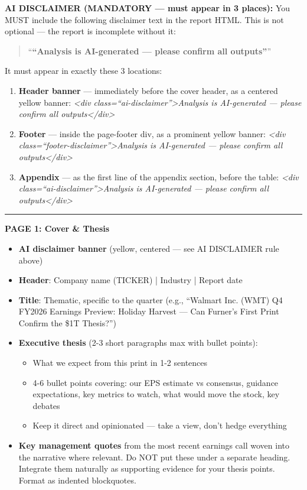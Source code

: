 \documentclass[11pt]{article}
\begin{document}
\textbf{AI DISCLAIMER (MANDATORY — must appear in 3 places):} You MUST include the following disclaimer text in the report HTML. This is not optional — the report is incomplete without it:


\begin{quote}
``\textbf{``Analysis is AI-generated — please confirm all outputs''}''
\end{quote}

It must appear in exactly these 3 locations:

\begin{enumerate}[leftmargin=*,itemsep=2pt,topsep=2pt]
\item {} \textbf{Header banner} — immediately before the cover header, as a centered yellow banner: \emph{<div class=``ai-disclaimer''>Analysis is AI-generated — please confirm all outputs</div>}
\item {} \textbf{Footer} — inside the page-footer div, as a prominent yellow banner: \emph{<div class=``footer-disclaimer''>Analysis is AI-generated — please confirm all outputs</div>}
\item {} \textbf{Appendix} — as the first line of the appendix section, before the table: \emph{<div class=``ai-disclaimer''>Analysis is AI-generated — please confirm all outputs</div>}
\end{enumerate}

\vspace{0.5em}\hrule\vspace{0.5em}

\textbf{PAGE 1: Cover \& Thesis}


\begin{itemize}[leftmargin=*,itemsep=2pt,topsep=2pt]
\item {} \textbf{AI disclaimer banner} (yellow, centered — see AI DISCLAIMER rule above)
\item {} \textbf{Header}: Company name (TICKER) | Industry | Report date
\item {} \textbf{Title}: Thematic, specific to the quarter (e.g., ``Walmart Inc. (WMT) Q4 FY2026 Earnings Preview: Holiday Harvest — Can Furner's First Print Confirm the \$1T Thesis?'')
\item {} \textbf{Executive thesis} (2-3 short paragraphs max with bullet points):
\begin{itemize}[leftmargin=*,itemsep=2pt,topsep=2pt]
\item {} What we expect from this print in 1-2 sentences
\item {} 4-6 bullet points covering: our EPS estimate vs consensus, guidance expectations, key metrics to watch, what would move the stock, key debates
\item {} Keep it direct and opinionated — take a view, don't hedge everything
\end{itemize}
\item {} \textbf{Key management quotes} from the most recent earnings call woven into the narrative where relevant. Do NOT put these under a separate heading. Integrate them naturally as supporting evidence for your thesis points. Format as indented blockquotes.
\end{itemize}
\end{document}
